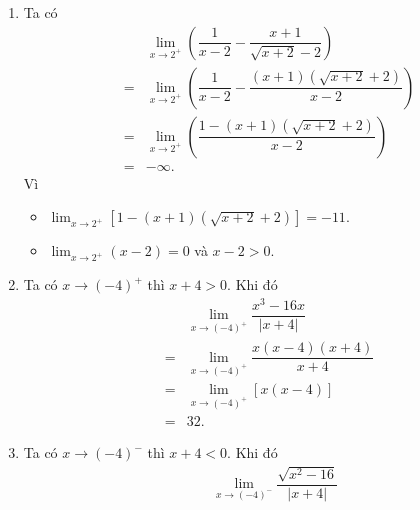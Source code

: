 \begin{ex}
{\begin{enumerate}
\begin{eqnarray*}
				&=&\displaystyle\lim_{x \to  \left(-1\right)^-} \dfrac{\sqrt{(-1-x)(4-x)}}{(-1-x)(-1+x)}\\
				&=&\displaystyle\lim_{x \to \left(-1\right)^-} \dfrac{\sqrt{4-x}}{\sqrt{-1-x} \cdot(-1+x)}\\ 
				&=&-\infty. 
			\end{eqnarray*}
			 Vì
			\begin{itemize}
				\item $\displaystyle\lim_{x \to \left(-1\right)^-}  \dfrac{\sqrt{4-x}}{-1+x}=-\dfrac{\sqrt{5}}{2}$.
				\item $\displaystyle\lim_{x\to  \left(-1\right)^-}\sqrt{-1-x}=0$ và $\sqrt{-1-x}>0$.
			\end{itemize}
			\item  Ta có
			\begin{eqnarray*}
				&&\displaystyle\lim_{x\to  2^+}\left(\dfrac{1}{x-2}-\dfrac{x+1}{\sqrt{x+2}-2}\right)\\
				&=&\displaystyle\lim_{x\to 2^+}\left(\dfrac{1}{x-2}-\dfrac{(x+1)\left(\sqrt{x+2}+2\right)}{x-2}\right)\\ 
				&=&\displaystyle\lim_{x\to 2^+}\left(\dfrac{1-(x+1)\left(\sqrt{x+2}+2\right)}{x-2}\right)\\ 
				&=&-\infty. 
			\end{eqnarray*}
			 Vì
			\begin{itemize}
				 \item $\displaystyle\lim_{x \to 2^+}\left[1-(x+1)\left(\sqrt{x+2}+2\right)\right]=-11$.
				\item $\displaystyle\lim_{x\to  2^+}(x-2)=0$ và $x-2>0$.
			\end{itemize}
			\item Ta có $x \to \left(-4\right)^+$ thì $x+4>0$. Khi đó 
			\begin{eqnarray*}
				&&\displaystyle\lim_{x \to  \left(-4\right)^+} \dfrac{x^3-16x}{\left|x+4\right|}\\
				&=&\displaystyle\lim_{x  \to \left(-4\right)^+} \dfrac{x(x-4)(x+4)}{x+4}\\
				&=&\displaystyle\lim_{x \to \left(-4\right)^+} \left[x(x-4)\right]\\ 
				 &=&32.
			\end{eqnarray*}
			\item Ta  có $x \to \left(-4\right)^-$ thì $x+4<0$. Khi đó
			\begin{eqnarray*}
				 &&\displaystyle\lim_{x \to \left(-4\right)^-} \dfrac{\sqrt{x^2-16}}{\left|x+4\right|}\\

\end{eqnarray*}
\end{enumerate}}
\end{ex}
